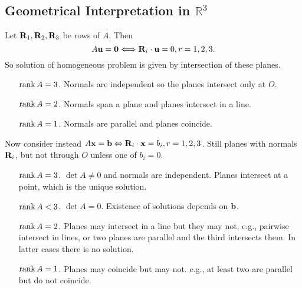 \documentclass[10pt]{article}
\begin{document}
    \subsection{Geometrical Interpretation in $ \mathbb{R}^{3} $}
    Let $ {\bf R}_1,{\bf R}_2,{\bf R}_3 $ be rows of $A$. Then 
    \[
        A{\bf u}=\mathbf{0}\Longleftrightarrow {\bf R}_i\cdot {\bf u}=0, r=1,2,3
    .\]
    So solution of homogeneous problem is given by intersection of these planes.
    \begin{enumerate}[align=hang]
        \item[\underline{$ \rank A=3 $}.] Normals are independent so the planes intersect only at $O$.
        \item[\underline{$ \rank A=2 $}.] Normals span a plane and planes intersect in a line.
        \item[\underline{$ \rank A=1 $}.] Normals are parallel and planes coincide.
    \end{enumerate}

    Now consider instead $ A{\bf x}=\mathbf{b}\Leftrightarrow {\bf R}_i\cdot {\bf x}=b_i, r=1,2,3 $. Still planes with normals $ {\bf R}_i $, but not through $O$ unless one of $b_i=0$.
    \begin{enumerate}[align=hang]
        \item[\underline{$ \rank A=3 $}.] $ \det A\neq 0 $ and normals are independent. Planes intersect at a point, which is the unique solution.
        \item[\underline{$ \rank A<3 $}.] $ \det A=0 $. Existence of solutions depends on ${\bf b}$.
        \item[\underline{$ \rank A=2 $}.] Planes may intersect in a line but they may not. e.g., pairwise intersect in lines, or two planes are parallel and the third intersects them. In latter cases there is no solution.
        \item[\underline{$ \rank A=1 $}.] Planes may coincide but may not. e.g., at least two are parallel but do not coincide.
    \end{enumerate}
    
\end{document}
